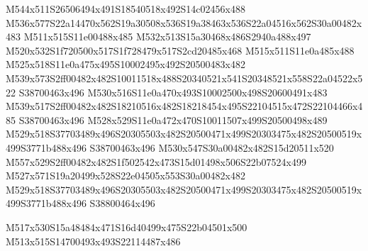 \documentclass{article}
\begin{document}
\begin{multicols}{2}








M544x511S26506494x491S18540518x492S14c02456x488 M536x577S22a14470x562S19a30508x536S19a38463x536S22a04516x562S30a00482x483 M511x515S11e00488x485 M532x513S15a30468x486S2940a488x497 M520x532S1f720500x517S1f728479x517S2cd20485x468 M515x511S11e0a485x488 M525x518S11e0a475x495S10002495x492S20500483x482 M539x573S2ff00482x482S10011518x488S20340521x541S20348521x558S22a04522x522 S38700463x496 M530x516S11e0a470x493S10002500x498S20600491x483 M539x517S2ff00482x482S18210516x482S18218454x495S22104515x472S22104466x485 S38700463x496 M528x529S11e0a472x470S10011507x499S20500498x489 M529x518S37703489x496S20305503x482S20500471x499S20303475x482S20500519x499S3771b488x496 S38700463x496 M530x547S30a00482x482S15d20511x520 M557x529S2ff00482x482S1f502542x473S15d01498x506S22b07524x499 M527x571S19a20499x528S22e04505x553S30a00482x482 M529x518S37703489x496S20305503x482S20500471x499S20303475x482S20500519x499S3771b488x496 S38800464x496

\begin{center}
M517x530S15a48484x471S16d40499x475S22b04501x500 M513x515S14700493x493S22114487x486 
\end{center}




\end{multicols}
\end{document}
